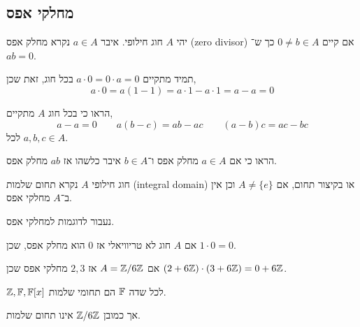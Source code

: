 \subsection{מחלקי אפס}
\begin{definition}
	יהי $A$ חוג חילופי.
	איבר $a \in A$ נקרא מחלק אפס (zero divisor) אם קיים $0 \ne b \in A$ כך ש־$a b = 0$.
\end{definition}
\begin{remark}
	תמיד מתקיים $a \cdot 0 = 0 \cdot a = 0$ בכל חוג, זאת שכן,
	\[
		a \cdot 0
		= a (1 - 1)
		= a \cdot 1 - a \cdot 1
		= a - a
		= 0
	\]
\end{remark}
\begin{exercise}
	הראו כי בכל חוג $A$ מתקיים,
	\[
		a - a = 0
		\qquad
		a (b - c) = a b - a c
		\qquad
		(a - b) c
		= a c - b c
	\]
	לכל $a, b, c \in A$.
\end{exercise}
\begin{example}
	הראו כי אם $a \in A$ מחלק אפס ו־$b \in A$ איבר כלשהו אז $a b$ מחלק אפס.
\end{example}
\begin{definition}
	חוג חילופי $A$ נקרא תחום שלמות (integral domain) או בקיצור תחום,
	אם $A \ne \{ e \}$ וכן אין ב־$A$ מחלקי אפס.
\end{definition}
נעבור לדוגמות למחלקי אפס.
\begin{example}
	אם $A$ חוג לא טריוויאלי אז $0$ הוא מחלק אפס,
	שכן $1 \cdot  0 = 0$.
\end{example}
\begin{example}
	אם $A = \mathbb{Z} / 6 \mathbb{Z}$ אז $2, 3$ מחלקי אפס שכן $(2 + 6 \mathbb{Z}) \cdot (3 + 6 \mathbb{Z}) = 0 + 6 \mathbb{Z}$.
\end{example}
\begin{example}
	$\mathbb{Z}, \mathbb{F}, \mathbb{F}[x]$ לכל שדה $\mathbb{F}$ הם תחומי שלמות.
\end{example}
אך כמובן $\mathbb{Z} / 6 \mathbb{Z}$ אינו תחום שלמות.

